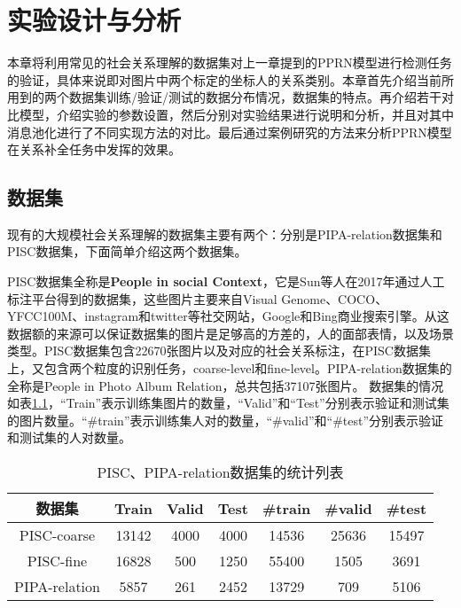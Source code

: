 
\chapter{实验设计与分析}
\label{ch:exp}

本章将利用常见的社会关系理解的数据集对上一章提到的PPRN模型进行检测任务的验证，具体来说即对图片中两个标定的坐标人的关系类别。本章首先介绍当前所用到的两个数据集训练/验证/测试的数据分布情况，数据集的特点。再介绍若干对比模型，介绍实验的参数设置，然后分别对实验结果进行说明和分析，并且对其中消息池化进行了不同实现方法的对比。最后通过案例研究的方法来分析PPRN模型在关系补全任务中发挥的效果。

\section{数据集}

现有的大规模社会关系理解的数据集主要有两个：分别是PIPA-relation\cite{sun2017a}数据集和PISC\cite{li2017dual-glance}数据集，下面简单介绍这两个数据集。

PISC数据集全称是\textbf{People in social Context}，它是Sun等人在2017年通过人工标注平台得到的数据集，这些图片主要来自Visual Genome\cite{krishna2017visual}、COCO\cite{lin2014microsoft}、YFCC100M\cite{thomee2016yfcc100m}、instagram和twitter等社交网站，Google和Bing商业搜索引擎。从这数据额的来源可以保证数据集的图片是足够高的方差的，人的面部表情，以及场景类型。PISC数据集包含22670张图片以及对应的社会关系标注，在PISC数据集上，又包含两个粒度的识别任务，coarse-level和fine-level。PIPA-relation数据集的全称是People in Photo Album Relation，总共包括37107张图片。
数据集的情况如表\ref{tab:exp-pisc-statistic}，``Train''表示训练集图片的数量，``Valid''和``Test''分别表示验证和测试集的图片数量。``#train''表示训练集人对的数量，``#valid''和``#test''分别表示验证和测试集的人对数量。
\begin{table}[htpb]
  \centering
  \caption{PISC、PIPA-relation数据集的统计列表}
  \label{tab:exp-pisc-statistic}
  \begin{tabular}{c|c|c|c|c|c|c}
    \toprule
    数据集 & Train & Valid & Test & #train  &  #valid &  #test  \\
    \midrule
    PISC-coarse & 13142 & 4000 & 4000 & 14536 & 25636 & 15497   \\
    \midrule
    PISC-fine &  16828 & 500 & 1250 & 55400 & 1505 & 3691 \\
    \midrule
    PIPA-relation & 5857 & 261 & 2452 & 13729 & 709 & 5106 \\
    \bottomrule
  \end{tabular}
\end{table}